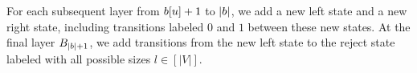 
For each subsequent layer from $b[u]+1$ to $|b|$, we add a new left state and a new right state, including transitions labeled $0$ and $1$ between these new states. At the final layer $B_{|b|+1}$, we add transitions from the new left state to the reject state labeled with all possible sizes $l \in [|V|]$.





